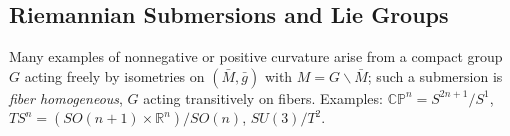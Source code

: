 \subsection{Riemannian Submersions and Lie Groups}

\begin{remark}
  \label{rem:pet-ch4-fiber-homogeneous-submersions}
  Many examples of nonnegative or positive curvature arise from a compact
  group $G$ acting freely by isometries on $(\bar M,\bar g)$ with
  $M=G\backslash\bar M$; such a submersion is \emph{fiber homogeneous}, $G$
  acting transitively on fibers. Examples: $\mathbb{CP}^n=S^{2n+1}/S^1$,
  $TS^n=(SO(n+1)\times\mathbb{R}^n)/SO(n)$, $SU(3)/T^2$.
\end{remark}

